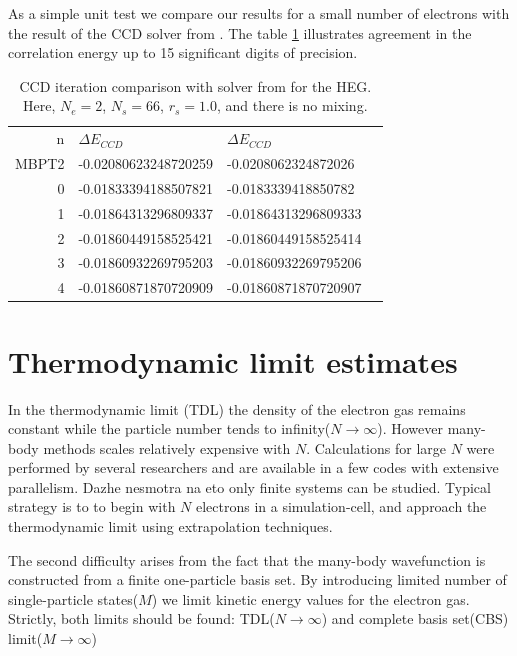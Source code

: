 \documentclass[twoside,english]{uiofysmaster}
\begin{document}
As a simple unit test we compare our results for a small number of electrons with the result of the CCD solver from \cite{Hjorth-Jensenadvancedcoursecomputational2017}. The table \ref{tab:unittest} illustrates agreement in the correlation energy up to 15 significant digits of precision.

\begin{table}[h]
\centering
\captionsetup{width=.8\textwidth}
\caption{CCD iteration comparison with solver from \cite{Hjorth-Jensenadvancedcoursecomputational2017} for the HEG. Here, $N_e=2$, $N_s=66$, $r_s=1.0$, and there is no mixing. }
        	\begin{tabular}{rlll}
        		n & $\Delta E_{CCD}$     & $\Delta E_{CCD}$ \cite{Hjorth-Jensenadvancedcoursecomputational2017} \\
        		MBPT2 & -0.02080623248720259 & -0.0208062324872026  \\
        		0 & -0.01833394188507821 & -0.0183339418850782  \\
        		1 & -0.01864313296809337 & -0.01864313296809333 \\
        		2 & -0.01860449158525421 & -0.01860449158525414 \\
        		3 & -0.01860932269795203 & -0.01860932269795206 \\
        		4 & -0.01860871870720909 & -0.01860871870720907 \\
\end{tabular}
\label{tab:unittest}
\end{table}
                              



\section{Thermodynamic limit estimates}

In the thermodynamic limit (TDL) the density of the electron gas remains constant while the particle number tends to infinity($N\rightarrow \infty$). However many-body methods scales relatively expensive with $N$. Calculations for large $N$ were performed by several researchers and are available in a few codes with extensive parallelism. Dazhe nesmotra na eto only finite systems can be studied. Typical strategy is to to begin with $N$ electrons in a simulation-cell, and approach the thermodynamic limit using extrapolation techniques.

The second difficulty arises from the fact that the many-body wavefunction is constructed from a finite one-particle basis set. By introducing limited number of single-particle states($M$) we limit kinetic energy values for the electron gas. Strictly, both limits should be found: TDL($N\rightarrow \infty$) and complete basis set(CBS) limit($M \rightarrow \infty$)
\end{document}
